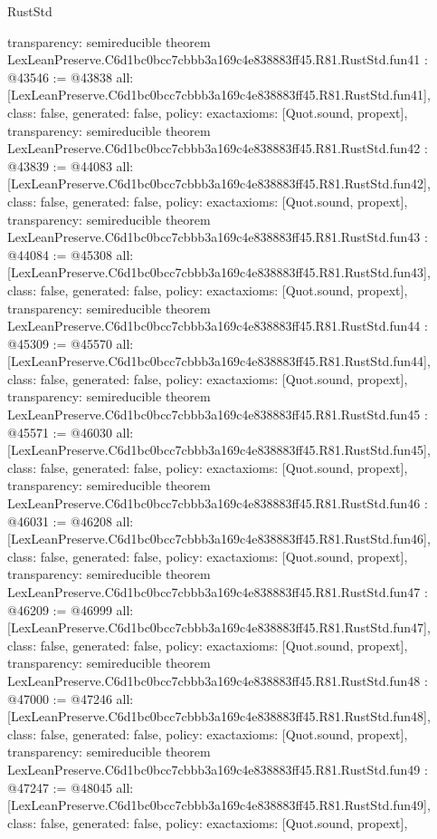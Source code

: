 \begin{lexlean}{RustStd}
\begin{coremodule}
{  transparency: semireducible
}
theorem LexLeanPreserve.C6d1bc0bcc7cbbb3a169c4e838883ff45.R81.RustStd.fun41 : @43546 := @43838 {
  all: [LexLeanPreserve.C6d1bc0bcc7cbbb3a169c4e838883ff45.R81.RustStd.fun41],
  class: false,
  generated: false,
  policy: exact{axioms: [Quot.sound, propext]},
  transparency: semireducible
}
theorem LexLeanPreserve.C6d1bc0bcc7cbbb3a169c4e838883ff45.R81.RustStd.fun42 : @43839 := @44083 {
  all: [LexLeanPreserve.C6d1bc0bcc7cbbb3a169c4e838883ff45.R81.RustStd.fun42],
  class: false,
  generated: false,
  policy: exact{axioms: [Quot.sound, propext]},
  transparency: semireducible
}
theorem LexLeanPreserve.C6d1bc0bcc7cbbb3a169c4e838883ff45.R81.RustStd.fun43 : @44084 := @45308 {
  all: [LexLeanPreserve.C6d1bc0bcc7cbbb3a169c4e838883ff45.R81.RustStd.fun43],
  class: false,
  generated: false,
  policy: exact{axioms: [Quot.sound, propext]},
  transparency: semireducible
}
theorem LexLeanPreserve.C6d1bc0bcc7cbbb3a169c4e838883ff45.R81.RustStd.fun44 : @45309 := @45570 {
  all: [LexLeanPreserve.C6d1bc0bcc7cbbb3a169c4e838883ff45.R81.RustStd.fun44],
  class: false,
  generated: false,
  policy: exact{axioms: [Quot.sound, propext]},
  transparency: semireducible
}
theorem LexLeanPreserve.C6d1bc0bcc7cbbb3a169c4e838883ff45.R81.RustStd.fun45 : @45571 := @46030 {
  all: [LexLeanPreserve.C6d1bc0bcc7cbbb3a169c4e838883ff45.R81.RustStd.fun45],
  class: false,
  generated: false,
  policy: exact{axioms: [Quot.sound, propext]},
  transparency: semireducible
}
theorem LexLeanPreserve.C6d1bc0bcc7cbbb3a169c4e838883ff45.R81.RustStd.fun46 : @46031 := @46208 {
  all: [LexLeanPreserve.C6d1bc0bcc7cbbb3a169c4e838883ff45.R81.RustStd.fun46],
  class: false,
  generated: false,
  policy: exact{axioms: [Quot.sound, propext]},
  transparency: semireducible
}
theorem LexLeanPreserve.C6d1bc0bcc7cbbb3a169c4e838883ff45.R81.RustStd.fun47 : @46209 := @46999 {
  all: [LexLeanPreserve.C6d1bc0bcc7cbbb3a169c4e838883ff45.R81.RustStd.fun47],
  class: false,
  generated: false,
  policy: exact{axioms: [Quot.sound, propext]},
  transparency: semireducible
}
theorem LexLeanPreserve.C6d1bc0bcc7cbbb3a169c4e838883ff45.R81.RustStd.fun48 : @47000 := @47246 {
  all: [LexLeanPreserve.C6d1bc0bcc7cbbb3a169c4e838883ff45.R81.RustStd.fun48],
  class: false,
  generated: false,
  policy: exact{axioms: [Quot.sound, propext]},
  transparency: semireducible
}
theorem LexLeanPreserve.C6d1bc0bcc7cbbb3a169c4e838883ff45.R81.RustStd.fun49 : @47247 := @48045 {
  all: [LexLeanPreserve.C6d1bc0bcc7cbbb3a169c4e838883ff45.R81.RustStd.fun49],
  class: false,
  generated: false,
  policy: exact{axioms: [Quot.sound, propext]},
}
\end{coremodule}
\end{lexlean}
